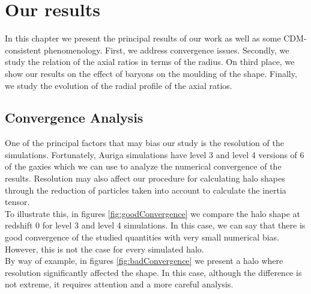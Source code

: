 \chapter{Our results}

In this chapter we present the principal results of our work as well as some CDM-consistent phenomenology. First, we address convergence issues. Secondly, we study the relation of the axial ratios in terms of the radius. On third place, we show our results on the effect of baryons on the moulding of the shape. Finally, we study the evolution of the radial profile of the axial ratios. 

\section{Convergence Analysis}
One of the principal factors that may bias our study is the resolution of the simulations. Fortunately, Auriga simulations have level 3 and level 4 versions of 6 of the gaxies which we can use to analyze the numerical convergence of the results. Resolution may also affect our procedure for calculating halo shapes through the reduction of particles taken into account to calculate the inertia tensor.\\

To illustrate this, in figures \ref{fig:goodConvergence} we compare the halo shape at redshift 0 for level 3 and level 4 simulations. In this case, we can say that there is good convergence of the studied quantities with very small numerical bias. However, this is not the case for every simulated halo.\\

 By way of example, in figures \ref{fig:badConvergence} we present a halo where resolution significantly affected the shape. In this case, although the difference is not extreme, it requires attention and a more careful analysis.\\

